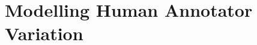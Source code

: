 \documentclass[11pt]{article}
\begin{document}

\section{Modelling Human Annotator Variation}
\label{sec:modellingvariation}
\end{document}
